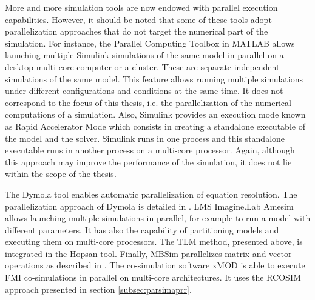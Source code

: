 More and more simulation tools are now endowed with parallel execution capabilities. However, it should be noted that some of these tools adopt parallelization approaches that do not target the numerical part of the simulation. For instance, the Parallel Computing Toolbox in MATLAB allows launching multiple Simulink simulations of the same model in parallel on a desktop multi-core computer or a cluster. These are separate independent simulations of the same model. This feature allows running multiple simulations under different configurations and conditions at the same time. It does not correspond to the focus of this thesis, i.e. the parallelization of the numerical computations of a simulation. Also, Simulink provides an execution mode known as Rapid Accelerator Mode which consists in creating a standalone executable of the model and the solver. Simulink runs in one process and this standalone executable runs in another process on a multi-core processor. Again, although this approach may improve the performance of the simulation, it does not lie within the scope of the thesis.

The Dymola tool enables automatic parallelization of equation resolution. The parallelization approach of Dymola is detailed in \cite{elmqvist:2014}. LMS Imagine.Lab Amesim allows launching multiple simulations in parallel, for example to run a model with different parameters. It has also the capability of partitioning models and executing them on multi-core processors. The TLM method, presented above, is integrated in the Hopsan tool. Finally, MBSim parallelizes matrix and vector operations as described in \cite{clauberg:2012}. The co-simulation software xMOD is able to execute FMI co-simulations in parallel on multi-core architectures. It uses the RCOSIM approach \cite{benkhaled:2014} presented in section \ref{subsec:parsimaprr}.  